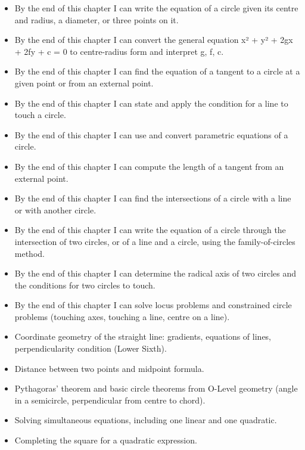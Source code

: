 \documentclass[11pt]{article}
\begin{document}
\begin{objectifs}
\begin{itemize}
\item By the end of this chapter I can write the equation of a circle given its centre and radius, a diameter, or three points on it.
\item By the end of this chapter I can convert the general equation x² + y² + 2gx + 2fy + c = 0 to centre-radius form and interpret g, f, c.
\item By the end of this chapter I can find the equation of a tangent to a circle at a given point or from an external point.
\item By the end of this chapter I can state and apply the condition for a line to touch a circle.
\item By the end of this chapter I can use and convert parametric equations of a circle.
\item By the end of this chapter I can compute the length of a tangent from an external point.
\item By the end of this chapter I can find the intersections of a circle with a line or with another circle.
\item By the end of this chapter I can write the equation of a circle through the intersection of two circles, or of a line and a circle, using the family-of-circles method.
\item By the end of this chapter I can determine the radical axis of two circles and the conditions for two circles to touch.
\item By the end of this chapter I can solve locus problems and constrained circle problems (touching axes, touching a line, centre on a line).
\end{itemize}
\end{objectifs}

\begin{prerequis}
\begin{itemize}
\item Coordinate geometry of the straight line: gradients, equations of lines, perpendicularity condition (Lower Sixth).
\item Distance between two points and midpoint formula.
\item Pythagoras' theorem and basic circle theorems from O-Level geometry (angle in a semicircle, perpendicular from centre to chord).
\item Solving simultaneous equations, including one linear and one quadratic.
\item Completing the square for a quadratic expression.
\end{itemize}
\end{prerequis}
\end{document}
